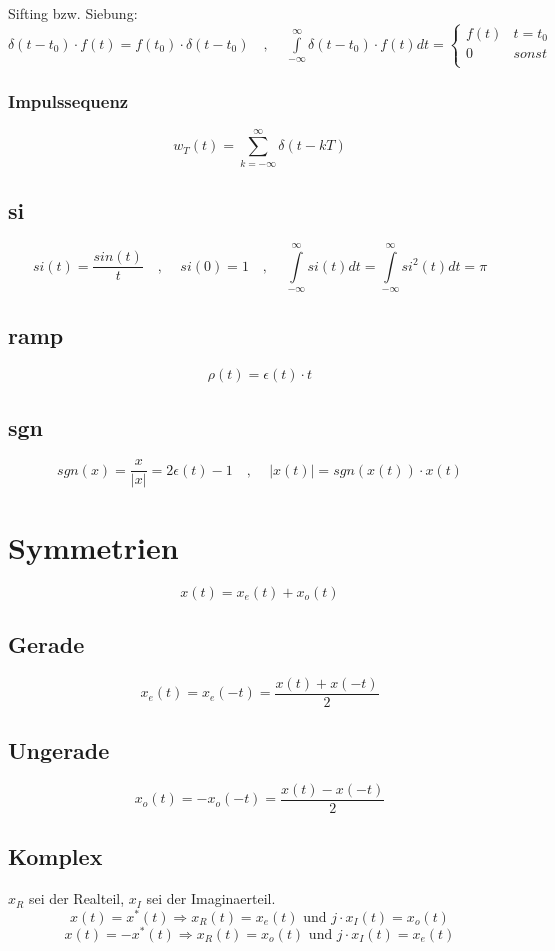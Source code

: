 \documentclass[10pt,a4paper]{article}
\begin{document}
Sifting bzw. Siebung: $\delta(t-t_0)\cdot f(t) = f(t_0)\cdot \delta(t-t_0) \,\,\,\,\,\,,\,\,\,\,\,\,\,
\int\limits_{-\infty}^\infty \delta(t-t_0)\cdot f(t) dt  =
\begin{cases}
f(t) & t = t_0 \\
0 & sonst \\
\end{cases}$

\subsubsection{Impulssequenz}
\[
w_T(t) = \sum\limits_{k=-\infty}^\infty \delta(t-kT)
\]

\subsection{si}
\[
si(t) = \frac{sin(t)}{t}\,\,\,\,\,\,,\,\,\,\,\,\,\, si(0) = 1\,\,\,\,\,\,,\,\,\,\,\,\,\, \int\limits_{-\infty}^\infty si(t) dt= \int\limits_{-\infty}^\infty si^2(t) dt = \pi
\]

\subsection{ramp}
\[ \rho(t) = \epsilon(t)\cdot t \]

\subsection{sgn}
\[ sgn(x) = \frac{x}{|x|} = 2 \epsilon(t) -1 \,\,\,\,\,\,,\,\,\,\,\,\,\, |x(t)| = sgn(x(t)) \cdot x(t) \]

\section{Symmetrien}
\[x(t) = x_e(t) + x_o(t)\]
\subsection{Gerade}
\[ x_e(t) = x_e(-t) = \frac{x(t)+x(-t)}{2}
\]
\subsection{Ungerade}
\[ x_o(t) = -x_o(-t) = \frac{x(t)-x(-t)}{2}
\]

\subsection{Komplex}
$x_R$ sei der Realteil, $x_I$ sei der Imaginaerteil.
\[x(t) = x^*(t) \Rightarrow x_R(t) = x_e(t) \mbox{ und } j\cdot x_I(t) = x_o(t)\]
\[x(t) = -x^*(t) \Rightarrow x_R(t) = x_o(t) \mbox{ und } j\cdot x_I(t) = x_e(t)\]
\end{document}
